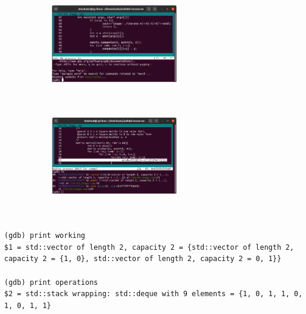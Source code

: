 \documentclass[a4paper,11pt]{article}
\numberwithin{definition}{section}
\numberwithin{mytheorem}{subsection}
\begin{document}
\begin{figure}[h]

\begin{subfigure}{210}
\includegraphics[width=210, height=4.5cm]{First Screenshot.png} 

\end{subfigure}
\begin{subfigure}{210}
\includegraphics[width=210, height=4.5cm]{Second Screenshot.png}

\end{subfigure}

\end{figure}
\\
\texttt{(gdb) print working}\\
\texttt{\$1 = std::vector of length 2, capacity 2 = \{std::vector of length 2, capacity 2 = \{1, 0\}, std::vector of length 2, capacity 2 = {0, 1}\}\}}\\\\
\texttt{(gdb) print operations}\\
\texttt{\$2 = std::stack wrapping: std::deque with 9 elements = \{1, 0, 1, 1, 0, 1, 0, 1, 1\}}\\\\
\end{document}
